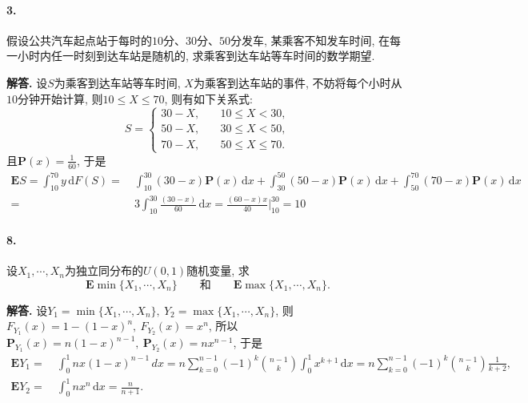 \documentclass[12pt, a4paper, oneside]{ctexart}
\newenvironment{solution}{\par\noindent\textbf{解答. }}{\bigskip\par}
\let\leq=\leqslant %
\def\d{\mathrm{d}}      %
\def\P{\textbf{P}}      %
\def\E{\textbf{E}}      %
\begin{document}
\paragraph{3.}假设公共汽车起点站于每时的$10$分、$30$分、$50$分发车, 某乘客不知发车时间, 在每一小时内任一时刻到达车站是随机的, 求乘客到达车站等车时间的数学期望.
\begin{solution}
    设$S$为乘客到达车站等车时间, $X$为乘客到达车站的事件, 不妨将每个小时从$10$分钟开始计算, 则$10\leq X\leq 70$, 则有如下关系式:
    \begin{equation*}
        S = \begin{cases}
            30 - X,&\quad 10\leq X < 30,\\
            50 - X,&\quad 30\leq X < 50,\\
            70 - X,&\quad 50\leq X\leq 70.
        \end{cases}
    \end{equation*}
    且$\P(x) = \frac{1}{60}$, 于是
    \begin{align*}
        \E S = \int_{10}^{70}y\,\d F(S) =&\ \int_{10}^{30}(30-x)\P(x)\,\d x+\int_{30}^{50}(50-x)\P(x)\,\d x+\int_{50}^{70}(70-x)\P(x)\,\d x \\
        =&\ 3\int_{10}^{30}\frac{(30-x)}{60}\,\d x= \frac{(60-x)x}{40}\biggl|_{10}^{30} = 10
    \end{align*}
\end{solution}
\paragraph{8.}设$X_1,\cdots, X_n$为独立同分布的$U(0,1)$随机变量, 求
\begin{equation*}
    \E\min\{X_1,\cdots, X_n\}\qquad\text{和}\qquad\E\max\{X_1,\cdots, X_n\}.
\end{equation*}
\begin{solution}
    设$Y_1 = \min\{X_1,\cdots, X_n\},\ Y_2 = \max\{X_1,\cdots, X_n\}$, 则$F_{Y_1}(x) = 1-(1-x)^n,\ F_{Y_2}(x) = x^n$, 所以$\P_{Y_1}(x) = n(1-x)^{n-1},\ \P_{Y_2}(x) = nx^{n-1}$, 于是
    \begin{align*}
        \E Y_1 =&\ \int_0^1nx(1-x)^{n-1}\,dx = n\sum_{k=0}^{n-1}(-1)^k\binom{n-1}{k}\int_0^1x^{k+1}\,\d x = n\sum_{k=0}^{n-1}(-1)^k\binom{n-1}{k}\frac{1}{k+2},\\
        \E Y_2 =&\ \int_0^1nx^n\,\d x = \frac{n}{n+1}.
    \end{align*}
\end{solution}
\end{document}
